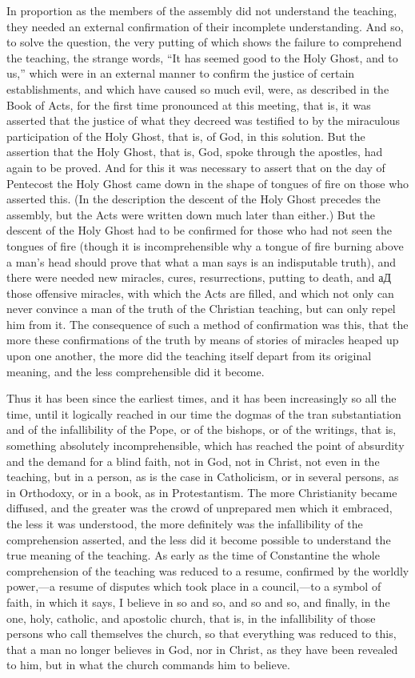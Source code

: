 \documentclass{book}
\begin{document}
In proportion as the members of the assembly did not understand the teaching, they needed an external confirmation of their incomplete understanding. And so, to solve the question, the very putting of which shows the failure to comprehend the teaching, the strange words, “It has seemed good to the Holy Ghost, and to us,” which were in an external manner to confirm the justice of certain establishments, and which have caused so much evil, were, as described in the Book of Acts, for the first time pronounced at this meeting, that is, it was asserted that the justice of what they decreed was testified to by the miraculous participation of the Holy Ghost, that is, of God, in this solution. But the assertion that the Holy Ghost, that is, God, spoke through the apostles, had again to be proved. And for this it was necessary to assert that on the day of Pentecost the Holy Ghost came down in the shape of tongues of fire on those who asserted this. (In the description the descent of the Holy Ghost precedes the assembly, but the Acts were written down much later than either.) But the descent of the Holy Ghost had to be confirmed for those who had not seen the tongues of fire (though it is incomprehensible why a tongue of fire burning above a man’s head should prove that what a man says is an indisputable truth), and there were needed new miracles, cures, resurrections, putting to death, and аД those offensive miracles, with which the Acts are filled, and which not only can never convince a man of the truth of the Christian teaching, but can only repel him from it. The consequence of such a method of confirmation was this, that the more these confirmations of the truth by means of stories of miracles heaped up upon one another, the more did the teaching itself depart from its original meaning, and the less comprehensible did it become.

Thus it has been since the earliest times, and it has been increasingly so all the time, until it logically reached in our time the dogmas of the tran substantiation and of the infallibility of the Pope, or of the bishops, or of the writings, that is, something absolutely incomprehensible, which has reached the point of absurdity and the demand for a blind faith, not in God, not in Christ, not even in the teaching, but in a person, as is the case in Catholicism, or in several persons, as in Orthodoxy, or in a book, as in Protestantism. The more Christianity became diffused, and the greater was the crowd of unprepared men which it embraced, the less it was understood, the more definitely was the infallibility of the comprehension asserted, and the less did it become possible to understand the true meaning of the teaching. As early as the time of Constantine the whole comprehension of the teaching was reduced to a resume, confirmed by the worldly power,—a resume of disputes which took place in a council,—to a symbol of faith, in which it says, I believe in so and so, and so and so, and finally, in the one, holy, catholic, and apostolic church, that is, in the infallibility of those persons who call themselves the church, so that everything was reduced to this, that a man no longer believes in God, nor in Christ, as they have been revealed to him, but in what the church commands him to believe.
\end{document}
